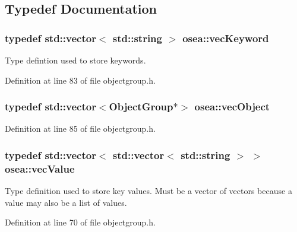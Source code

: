 \subsection{Typedef Documentation}
\hypertarget{namespaceosea_af47d453cb217c2c461685cd6e754c070}{
\subsubsection[{vec\-Keyword}]{\setlength{\rightskip}{0pt plus 5cm}typedef std\-::vector$<$ std\-::string $>$ {\bf osea\-::vec\-Keyword}}}\label{namespaceosea_af47d453cb217c2c461685cd6e754c070}


Type defintion used to store keywords. 



Definition at line 83 of file objectgroup.\-h.

\hypertarget{namespaceosea_ab25fb67447fccb23f5683988d96d2dc2}{
\subsubsection[{vec\-Object}]{\setlength{\rightskip}{0pt plus 5cm}typedef std\-::vector$<${\bf Object\-Group}$\ast$$>$ {\bf osea\-::vec\-Object}}}\label{namespaceosea_ab25fb67447fccb23f5683988d96d2dc2}


Definition at line 85 of file objectgroup.\-h.

\hypertarget{namespaceosea_ae7c5f2bab0fab3931b2ef51a0ad04cc2}{
\subsubsection[{vec\-Value}]{\setlength{\rightskip}{0pt plus 5cm}typedef std\-::vector$<$ std\-::vector$<$ std\-::string $>$ $>$ {\bf osea\-::vec\-Value}}}\label{namespaceosea_ae7c5f2bab0fab3931b2ef51a0ad04cc2}


Type definition used to store key values. Must be a vector of vectors because a value may also be a list of values. 



Definition at line 70 of file objectgroup.\-h.

